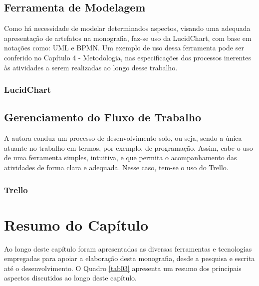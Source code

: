 \subsection{Ferramenta de Modelagem}
\label{sec:Ferramenta de Modelagem}
Como há necessidade de modelar determinados aspectos, visando uma adequada apresentação de artefatos na monografia, faz-se uso da LucidChart, com base em notações como: UML e BPMN. Um exemplo de 
uso dessa ferramenta pode ser conferido no Capítulo 4 - Metodologia, nas especificações dos processos inerentes às atividades a serem realizadas ao longo desse trabalho.

\subsubsection{LucidChart}
\label{sec:LucidChart}

\subsection{Gerenciamento do Fluxo de Trabalho}
\label{sec:Gerenciamento do Fluxo de Trabalho}
A autora conduz um processo de desenvolvimento solo, ou seja, sendo a única atuante no trabalho em termos, por exemplo, de programação. Assim, cabe o uso de uma ferramenta simples, intuitiva, e que 
permita o acompanhamento das atividades de forma clara e adequada. Nesse caso, tem-se o uso do Trello.

\subsubsection{Trello}
\label{sec:Trello}


\section{Resumo do Capítulo}
\label{sec:Resumo do Capítulo 2}
Ao longo deste capítulo foram apresentadas as diversas ferramentas e tecnologias empregadas para apoiar a elaboração desta monografia, desde a pesquisa e escrita até o desenvolvimento. 
O Quadro \ref{tab03} apresenta um resumo dos principais aspectos discutidos ao longo deste capítulo.

